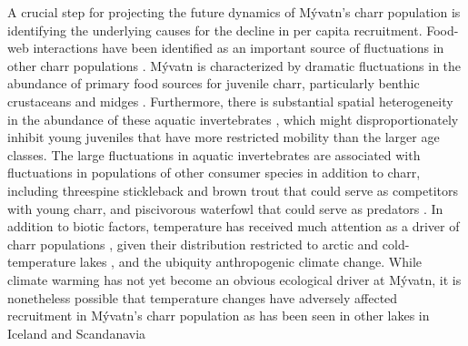 \documentclass[11pt]{article}
\begin{document}
A crucial step for projecting the future dynamics of M\'{y}vatn’s charr population 
is identifying the underlying causes for the decline in per capita recruitment.
Food-web interactions have been identified as an important source 
of fluctuations in other charr populations 
\citep{snorrason1992population, amundsen1994piscivory, jonsson2015freshwater}.
M\'{y}vatn is characterized by dramatic fluctuations in the abundance 
of primary food sources for juvenile charr, particularly benthic crustaceans 
and midges 
\citep{einarsson2004clad, gardarsson2004population, gudbergsson2004}.
Furthermore, there is substantial spatial heterogeneity in the abundance 
of these aquatic invertebrates \citep{bartrons2015spatial}, 
which might disproportionately inhibit young juveniles 
that have more restricted mobility than the larger age classes. 
The large fluctuations in aquatic invertebrates are associated 
with fluctuations in populations of other consumer species in addition to charr, 
including threespine stickleback and brown trout that could serve 
as competitors with young charr, and piscivorous waterfowl that could serve as predators 
\citep{einarsson2004myvatn}. 
In addition to biotic factors, 
temperature has received much attention as a driver of charr populations 
\citep{winfield2008arctic, elliott2010temperature, gerdeaux2011does, jonsson2015freshwater},
given their distribution restricted to arctic
and cold-temperature lakes \citep{klemetsen2003atlantic},
and the ubiquity anthropogenic climate change. 
While climate warming has not yet become an obvious ecological driver at M\'{y}vatn, 
it is nonetheless possible that temperature changes have adversely affected recruitment 
in M\'{y}vatn’s charr population as has been seen in other lakes in Iceland and Scandanavia
\citep{malmquist2009salmonid, svenning2021temporal}
\end{document}
